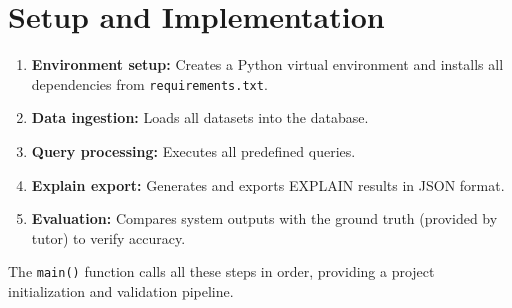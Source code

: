 \documentclass[11pt,a4paper]{article}
\begin{document}
\section{Setup and Implementation}

\begin{enumerate}
    \item \textbf{Environment setup:} Creates a Python virtual environment and installs all dependencies from \texttt{requirements.txt}.
    \item \textbf{Data ingestion:} Loads all datasets into the database.
    \item \textbf{Query processing:} Executes all predefined queries.
    \item \textbf{Explain export:} Generates and exports EXPLAIN results in JSON format.
    \item \textbf{Evaluation:} Compares system outputs with the ground truth (provided by tutor) to verify accuracy.
\end{enumerate}

The \texttt{main()} function calls all these steps in order, providing a project initialization and validation pipeline.
\end{document}
